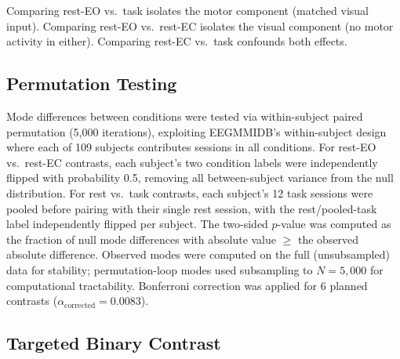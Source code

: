 \documentclass[11pt,a4paper]{article}
\begin{document}
Comparing rest-EO vs.\ task isolates the motor component (matched visual input). Comparing rest-EO vs.\ rest-EC isolates the visual component (no motor activity in either). Comparing rest-EC vs.\ task confounds both effects.

\subsection{Permutation Testing}
\label{sec:permutation}

Mode differences between conditions were tested via within-subject paired permutation (5,000 iterations), exploiting EEGMMIDB's within-subject design where each of 109 subjects contributes sessions in all conditions. For rest-EO vs.\ rest-EC contrasts, each subject's two condition labels were independently flipped with probability 0.5, removing all between-subject variance from the null distribution. For rest vs.\ task contrasts, each subject's 12 task sessions were pooled before pairing with their single rest session, with the rest/pooled-task label independently flipped per subject. The two-sided $p$-value was computed as the fraction of null mode differences with absolute value $\geq$ the observed absolute difference. Observed modes were computed on the full (unsubsampled) data for stability; permutation-loop modes used subsampling to $N = 5{,}000$ for computational tractability. Bonferroni correction was applied for 6 planned contrasts ($\alpha_{\text{corrected}} = 0.0083$).

\subsection{Targeted Binary Contrast}
\label{sec:targeted}
\end{document}

